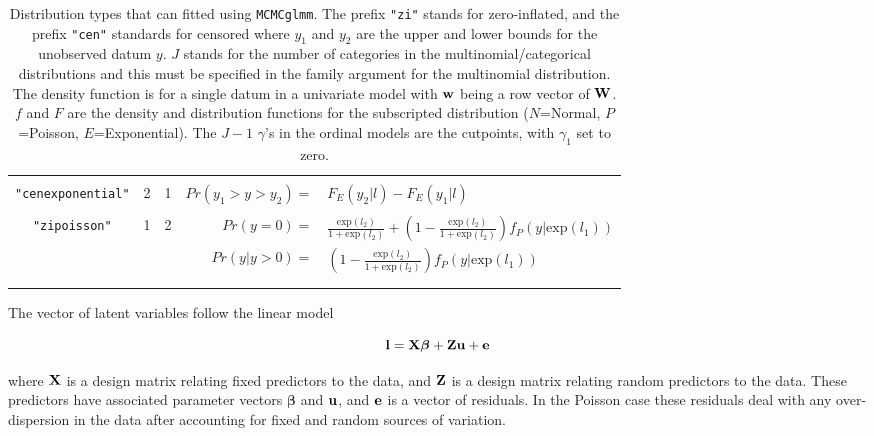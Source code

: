 \documentclass{article}
\begin{document}
\begin{landscape}
\begin{table}
\begin{center}
\begin{tabular}{cccrl}
&&&&\\
   \texttt{"cenexponential"}     &2    &  1  &          $Pr(y_{1}>y>y_{2}) =$&$ F_{E}(y_{2} | l)-F_{E}(y_{1} | l)$\\  
&&&&\\  
   \texttt{"zipoisson"}        &  1  &   2  &     $Pr(y=0) =$&$ \frac{\textrm{exp}(l_{2})}{1+\textrm{exp}(l_{2})}+\left(1-\frac{\textrm{exp}(l_{2})}{1+\textrm{exp}(l_{2})}\right)f_{P}(y|\textrm{exp}(l_{1}))$\\     
                                              &    &       & $Pr(y | y>0) =$&$ \left(1-\frac{\textrm{exp}(l_{2})}{1+\textrm{exp}(l_{2})}\right)f_{P}(y |\textrm{exp}(l_{1}))$\\      
&&&&\\
\hline\\
\end{tabular}
\caption{Distribution types that can fitted using \texttt{MCMCglmm}.  The prefix \texttt{"zi"} stands for zero-inflated, and the prefix \texttt{"cen"} standards for censored where $y_{1}$  and $y_{2}$ are the upper and lower bounds for the unobserved datum $y$. $J$ stands for the number of categories in the multinomial/categorical distributions and this must be specified in the family argument for the multinomial distribution. The density function is for a single datum in a univariate model with ${\bf w}$ being a row vector of ${\bf W}$.  $f$ and $F$ are the density and distribution functions for the subscripted distribution ($N$=Normal, $P$=Poisson, $E$=Exponential). The $J-1$ $\gamma$'s in the ordinal models are the cutpoints, with $\gamma_{1}$ set to zero.\label{dist-tab}}
\end{center}
\end{table}
\end{landscape}

The vector of latent variables follow the linear model

\begin{equation}
{\bf l}  = {\bf X}{\bm \beta}+{\bf Z}{\bf u}+{\bf e}
\label{l-Eq}
\end{equation}
 
where ${\bf X}$ is a design matrix relating fixed predictors to the data, and ${\bf Z}$ is a design matrix relating random predictors to the data.  These predictors have associated parameter vectors ${\bm \beta}$ and ${\bf u}$, and ${\bf e}$ is a vector of residuals.  In the Poisson case these residuals deal with any over-dispersion in the data after accounting for fixed and random sources of variation.\\
\end{document}
